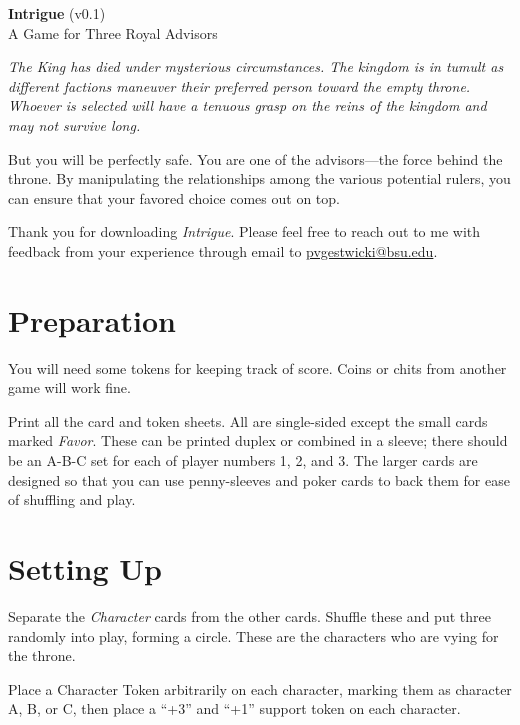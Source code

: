 \documentclass{article}
\begin{document}
\begin{centering}
  \Large{\textbf {Intrigue}} (v0.1)\\
  A Game for Three Royal Advisors\\
\end{centering}

\vspace{0.5cm}

{\itshape The King has died under mysterious circumstances. The
  kingdom is in tumult as different factions maneuver their preferred
  person toward the empty throne.  Whoever is selected will have a
  tenuous grasp on the reins of the kingdom and may not survive long.

  But you will be perfectly safe. You are one of the advisors---the force
  behind the throne. By manipulating the relationships among the
  various potential rulers, you can ensure that your favored
  choice comes out on top.
}

\vspace{0.5cm}

Thank you for downloading \textit{Intrigue}. Please feel free to reach
out to me with feedback from your experience through email to
\url{pvgestwicki@bsu.edu}. 


\section*{Preparation}

You will need some tokens for keeping track of score. Coins or chits from
another game will work fine.

Print all the card and token sheets. All are single-sided except
the small cards marked \textit{Favor}. These can be printed duplex or
combined in a sleeve; there should be an A-B-C set for each of player
numbers 1, 2, and 3. The larger cards are designed so that you can
use penny-sleeves and poker cards to back them for ease of shuffling
and play.


\section*{Setting Up}

Separate the \textit{Character} cards from the other cards.
Shuffle these and put three randomly into play, forming a circle.
These are the characters who are vying for the throne.

Place a Character Token arbitrarily on each character, marking them
as character A, B, or C, then place a ``+3'' and ``+1'' support
token on each character.
\end{document}

